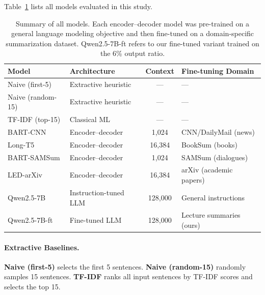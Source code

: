 Table~\ref{tab:models} lists all models evaluated in this study.

\begin{table}[H]
\centering
\caption{Summary of all models. Each encoder--decoder model was pre-trained on a general language modeling objective and then fine-tuned on a domain-specific summarization dataset. Qwen2.5-7B-ft refers to our fine-tuned variant trained on the 6\% output ratio.}
\label{tab:models}
\begin{tabular}{llcl}
\toprule
Model & Architecture & Context & Fine-tuning Domain \\
\midrule
Naive (first-5) & Extractive heuristic & --- & --- \\
Naive (random-15) & Extractive heuristic & --- & --- \\
TF-IDF (top-15) & Classical ML & --- & --- \\
BART-CNN & Encoder--decoder & 1,024 & CNN/DailyMail (news) \\
Long-T5 & Encoder--decoder & 16,384 & BookSum (books) \\
BART-SAMSum & Encoder--decoder & 1,024 & SAMSum (dialogues) \\
LED-arXiv & Encoder--decoder & 16,384 & arXiv (academic papers) \\
Qwen2.5-7B & Instruction-tuned LLM & 128,000 & General instructions \\
Qwen2.5-7B-ft & Fine-tuned LLM & 128,000 & Lecture summaries (ours) \\
\bottomrule
\end{tabular}
\end{table}

\paragraph{Extractive Baselines.}
\textbf{Naive (first-5)} selects the first 5 sentences. \textbf{Naive (random-15)} randomly samples 15 sentences. \textbf{TF-IDF} ranks all input sentences by TF-IDF scores and selects the top 15.

